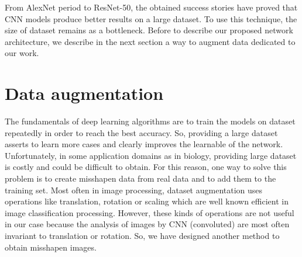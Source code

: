 \documentclass[review]{elsarticle}
\begin{document}
From AlexNet period to ResNet-50, the obtained success stories \cite{krizhevsky2012imagenet,he2016deep} have proved that CNN models produce better results on a large dataset. To use this technique, the size of dataset remains as a bottleneck. Before to describe our proposed network architecture, we describe in the next section a way to augment data dedicated to our work.


\section{Data augmentation}
\label{Sdataaug}

The fundamentals of deep learning algorithms are to train the models on dataset repeatedly in order to reach the best accuracy. So, providing a large dataset asserts to learn more cases and clearly improves the learnable of the network. Unfortunately, in some application domains as in biology, providing large dataset is costly and could be difficult to obtain. For this reason, one way to solve this problem is to create misshapen data from real data and to add them to the training set. Most often in image processing, dataset augmentation uses operations like translation, rotation or scaling which are well known efficient in image classification processing. However, these kinds of operations are not useful in our case because the analysis of images by CNN (convoluted) are most often invariant to translation or rotation. So, we have designed another method to obtain misshapen images.
\end{document}
